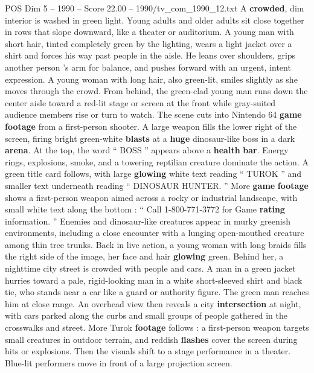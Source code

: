\begin{textsample}{POS Dim 5 – 1990 – Score 22.00 – 1990/tv\_com\_1990\_12.txt}  \label{ex:f5_pos_003}
A \textbf{crowded}, dim interior is washed in green light.
Young adults and older adults sit close together in rows that slope downward, like a theater or auditorium.
A young man with short hair, tinted completely green by the lighting, wears a light jacket over a shirt and forces his way past people in the aisle.
He leans over shoulders, grips another person ’s arm for balance, and pushes forward with an urgent, intent expression.
A young woman with long hair, also green-lit, smiles slightly as she moves through the crowd.
From behind, the green-clad young man runs down the center aisle toward a red-lit stage or screen at the front while gray-suited audience members rise or turn to watch.
The scene cuts into Nintendo 64 \textbf{game} \textbf{footage} from a first-person shooter.
A large weapon fills the lower right of the screen, firing bright green-white \textbf{blasts} at a \textbf{huge} dinosaur-like boss in a dark \textbf{arena}.
At the top, the word “ BOSS ” appears above a \textbf{health} \textbf{bar}.
Energy rings, explosions, smoke, and a towering reptilian creature dominate the action.
A green title card follows, with large \textbf{glowing} white text reading “ TUROK ” and smaller text underneath reading “ DINOSAUR HUNTER. ” More \textbf{game} \textbf{footage} shows a first-person weapon aimed across a rocky or industrial landscape, with small white text along the bottom : “ Call 1-800-771-3772 for Game \textbf{rating} information. ” Enemies and dinosaur-like creatures appear in murky greenish environments, including a close encounter with a lunging open-mouthed creature among thin tree trunks.
Back in live action, a young woman with long braids fills the right side of the image, her face and hair \textbf{glowing} green.
Behind her, a nighttime city street is crowded with people and cars.
A man in a green jacket hurries toward a pale, rigid-looking man in a white short-sleeved shirt and black tie, who stands near a car like a guard or authority figure.
The green man reaches him at close range.
An overhead view then reveals a city \textbf{intersection} at night, with cars parked along the curbs and small groups of people gathered in the crosswalks and street.
More Turok \textbf{footage} follows : a first-person weapon targets small creatures in outdoor terrain, and reddish \textbf{flashes} cover the screen during hits or explosions.
Then the visuals shift to a stage performance in a theater.
Blue-lit performers move in front of a large projection screen.

\end{textsample}
